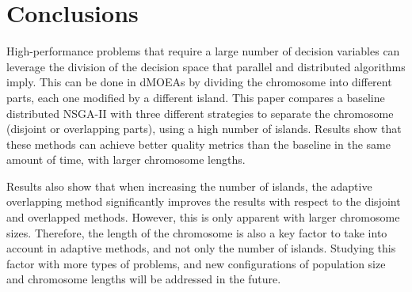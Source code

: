\documentclass[preprint]{elsarticle}
\begin{document}






\section{Conclusions}

High-performance problems %
 that require a large number of decision variables can leverage the
 division of the decision space that parallel and distributed
 algorithms imply. This can be done in dMOEAs by dividing the
 chromosome into different parts, each one modified by a different
 island. This paper compares a baseline distributed NSGA-II with three
 different strategies to separate the chromosome (disjoint or
 overlapping parts), using a high number of islands. Results show that
 these methods can achieve better quality metrics than the baseline in
 the same amount of time, with larger chromosome lengths. 

Results also show that when increasing the number of islands, the
adaptive overlapping method significantly improves the results with
respect to the disjoint and overlapped methods. However, this is only
apparent with larger chromosome sizes. Therefore, the length of the
chromosome is also a key factor to take into account in adaptive
methods, and not only the number of islands. Studying this factor with
more types of problems, and new configurations of population size and
chromosome lengths will be addressed in the future.%
\end{document}
